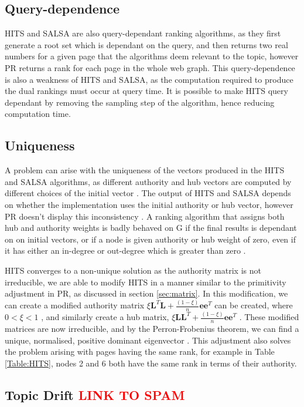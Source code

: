 \documentclass[11pt]{report}
\begin{document}
{\subsection{Query-dependence}
HITS and SALSA are also query-dependant ranking algorithms, as they first generate a root set which is dependant on the query, and then returns two real numbers for a given page that the algorithms deem relevant to the topic, however PR returns a rank for each page in the whole web graph. This query-dependence is also a weakness of HITS and SALSA, as the computation required to produce the dual rankings must occur at query time. It is possible to make HITS query dependant by removing the sampling step of the algorithm, hence reducing computation time. 

\subsection{Uniqueness}
A problem can arise with the uniqueness of the vectors produced in the HITS and SALSA algorithms, as different authority and hub vectors are computed by different choices of the initial vector \cite{langville}. The output of HITS and SALSA depends on whether the implementation uses the initial authority or hub vector, however PR doesn't display this inconsistency \cite{farahat2006authority}. A ranking algorithm that assigns both hub and authority weights is badly behaved on G if the final results is dependant on on initial vectors, or if a node is given authority or hub weight of zero, even if it has either an in-degree or out-degree which is greater than zero \cite{bonato}.

HITS converges to a non-unique solution as the authority matrix is not irreducible, we are able to modify HITS in a manner similar to the primitivity adjustment in PR, as discussed in section \ref{sec:matrix}. In this modification, we can create a modified authority matrix \(\xi\textbf{L}^T\textbf{L} +\frac{(1-\xi)}{n}\textbf{ee}^T\) can be created, where $0<\xi<1$ \cite{ng2001stable}, and similarly create a hub matrix, \(\xi\textbf{LL}^T +\frac{(1-\xi)}{n}\textbf{ee}^T\) . These modified matrices are now irreducible, and by the Perron-Frobenius theorem, we can find a unique, normalised, positive dominant eigenvector \cite{meyer2000matrix}. This adjustment also solves the problem arising with pages having the same rank, for example in Table \ref{Table:HITS}, nodes 2 and 6 both have the same rank in terms of their authority.

\subsection{Topic Drift \textcolor{red}{LINK TO SPAM}}

}
\end{document}

